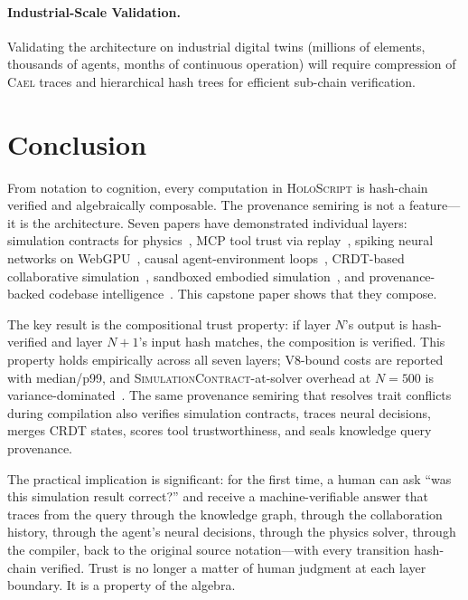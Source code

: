 \documentclass[sigchi-a]{acmart}
\newcommand{\holoscript}{\textsc{HoloScript}}
\newcommand{\cael}{\textsc{Cael}}
\newcommand{\simcontract}{\textsc{SimulationContract}}
\begin{document}
\paragraph{Industrial-Scale Validation.}
Validating the architecture on industrial digital twins (millions of
elements, thousands of agents, months of continuous operation) will
require compression of \cael{} traces and hierarchical hash trees
for efficient sub-chain verification.


\section{Conclusion}
\label{sec:conclusion}

From notation to cognition, every computation in \holoscript{} is hash-chain
verified and algebraically composable. The provenance semiring is not a
feature---it is the architecture. Seven papers have demonstrated individual
layers: simulation contracts for physics~\cite{trustbyconstruction2026},
MCP tool trust via replay~\cite{mcp-trust-paper}, spiking neural networks
on WebGPU~\cite{snn-paper}, causal agent-environment loops~\cite{cael-paper},
CRDT-based collaborative simulation~\cite{crdt-paper}, sandboxed embodied
simulation~\cite{sandbox-paper}, and provenance-backed codebase
intelligence~\cite{graphrag-paper}. This capstone paper shows that they
compose.

The key result is the compositional trust property: if layer $N$'s output is
hash-verified and layer $N{+}1$'s input hash matches, the composition is
verified. This property holds empirically across all seven layers; V8-bound
costs are reported with median/p99, and \simcontract{}-at-solver overhead at $N{=}500$
is variance-dominated~\cite{mcp-trust-paper}. The same provenance semiring that resolves trait
conflicts during compilation also verifies simulation contracts, traces
neural decisions, merges CRDT states, scores tool trustworthiness, and seals
knowledge query provenance.

The practical implication is significant: for the first time, a human can
ask ``was this simulation result correct?'' and receive a machine-verifiable
answer that traces from the query through the knowledge graph, through the
collaboration history, through the agent's neural decisions, through the
physics solver, through the compiler, back to the original source
notation---with every transition hash-chain verified. Trust is no longer a
matter of human judgment at each layer boundary. It is a property of the
algebra.
\end{document}
